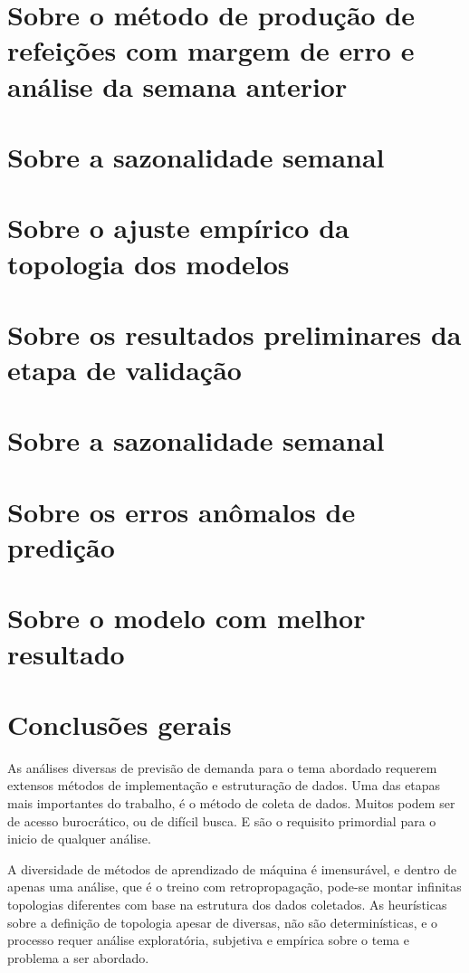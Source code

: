 \documentclass[	12pt, Times, openright, twoside, a4paper, english, brazil]{abntex2}
\begin{document}
    \section{Sobre o método de produção de refeições com margem de erro e análise da semana anterior}
    \section{Sobre a sazonalidade semanal}
    \section{Sobre o ajuste empírico da topologia dos modelos}
    \section{Sobre os resultados preliminares da etapa de validação}
    \section{Sobre a sazonalidade semanal}
    \section{Sobre os erros anômalos de predição}
    \section{Sobre o modelo com melhor resultado}
    \section{Conclusões gerais}
         As análises diversas de previsão de demanda para o tema abordado requerem extensos métodos de implementação e estruturação de dados.
        Uma das etapas mais importantes do trabalho, é o método de coleta de dados. Muitos podem ser de acesso burocrático, ou de difícil busca. E são o requisito primordial para o inicio de qualquer análise.
        
         A diversidade de métodos de aprendizado de máquina é imensurável, e dentro de apenas uma análise, que é o treino com retropropagação, pode-se montar infinitas topologias diferentes com base na estrutura dos dados coletados. 
        As heurísticas sobre a definição de topologia apesar de diversas, não são determinísticas, e o processo requer análise exploratória, subjetiva e empírica sobre o tema e problema a ser abordado.
        
\end{document}
